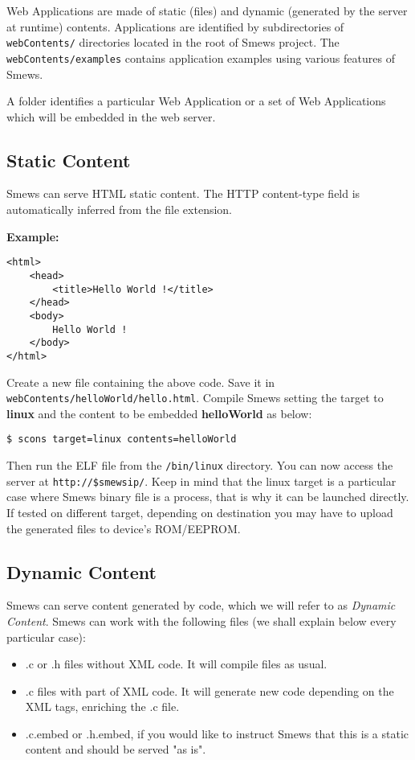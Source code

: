 \documentclass{report}
\begin{document}
Web Applications are made of static (files) and dynamic (generated by the server at runtime) contents. Applications are identified by subdirectories of \texttt{webContents/} directories located in the root of Smews project. The \texttt{webContents/examples} contains application examples using various features of Smews.

A folder identifies a particular Web Application or a set of Web Applications which will be embedded in the web server.

\subsection{Static Content}

Smews can serve HTML static content. The HTTP content-type field is automatically inferred from the file extension.

\textbf{Example:}
\begin{verbatim}
<html>
	<head>
		<title>Hello World !</title>
	</head>
	<body>
		Hello World !
	</body>
</html>
\end{verbatim}

Create a new file containing the above code. Save it in \texttt{webContents/helloWorld/hello.html}. Compile Smews setting the target to \textbf{linux} and the content to be embedded \textbf{helloWorld} as below:

\begin{verbatim}
$ scons target=linux contents=helloWorld
\end{verbatim}

Then run the ELF file from the \texttt{/bin/linux} directory. You can now access the server at \texttt{http://\$smewsip/}.
Keep in mind that the linux target is a particular case where Smews binary file is a process, that is why it can be launched directly. If tested on different target, depending on destination you may have to upload the generated files to device's ROM/EEPROM.

\subsection{Dynamic Content}
\label{subsub:cando}

Smews can serve content generated by code, which we will refer to as \textit{Dynamic Content}. Smews can work with the following files (we shall explain below every particular case):
\begin{itemize}
\item .c or .h files without XML code. It will compile files as usual.
\item .c files with part of XML code. It will generate new code depending on the XML tags, enriching the .c file.
\item .c.embed or .h.embed, if you would like to instruct Smews that this is a static content and should be served "as is".
\end{itemize}
\end{document}
